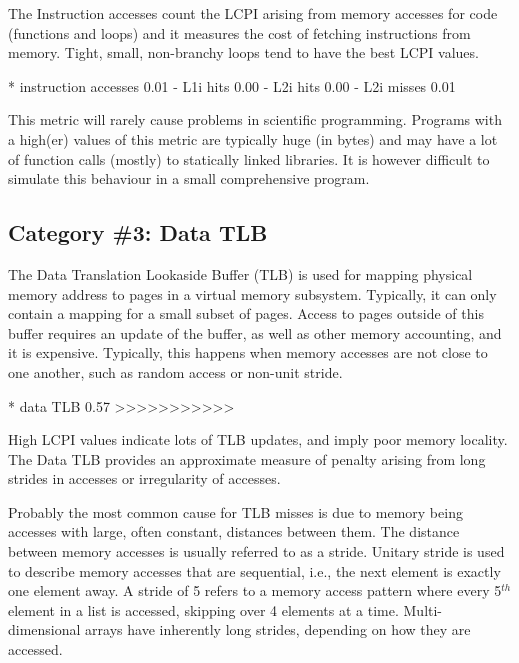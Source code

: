 The Instruction accesses count the LCPI arising from memory accesses for code (functions and loops) and it measures the cost of fetching instructions from memory. Tight, small, non-branchy loops tend to have the best LCPI values.

\begin{prompt}
* instruction accesses  0.01
 - L1i hits             0.00
 - L2i hits             0.00
 - L2i misses           0.01
\end{prompt}

This metric will rarely cause problems in scientific programming. Programs with a high(er) values of this metric are typically huge (in bytes) and may have a lot of function calls (mostly) to statically linked libraries. It is however difficult to simulate this behaviour in a small comprehensive program.

\subsection{Category \#3: Data TLB}
\label{subsec:CAT3_Data_TLB}

The Data Translation Lookaside Buffer (TLB) is used for mapping physical memory address to pages in a virtual memory subsystem. Typically, it can only contain a mapping for a small subset of pages. Access to pages outside of this buffer requires an update of the buffer, as well as other memory accounting, and it is expensive. Typically, this happens when memory accesses are not close to one another, such as random access or non-unit stride.

\begin{prompt}
* data TLB              0.57 >>>>>>>>>>>
\end{prompt}

High LCPI values indicate lots of TLB updates, and imply poor memory locality. The Data TLB provides an approximate measure of penalty arising from long strides in accesses or irregularity of accesses.

Probably the most common cause for TLB misses is due to memory being accesses with large, often constant, distances between them. The distance between memory accesses is usually referred to as a stride. Unitary stride is used to describe memory accesses that are sequential, i.e., the next element is exactly one element away. A stride of 5 refers to a memory access pattern where every 5${}^{th}$ element in a list is accessed, skipping over 4 elements at a time. Multi-dimensional arrays have inherently long strides, depending on how they are accessed.

